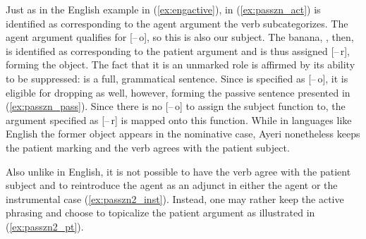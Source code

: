 Just as in the English example in (\ref{ex:engactive}),  in
(\ref{ex:passzn_act}) is identified as corresponding to the agent argument the
verb  subcategorizes. The agent argument qualifies for
[–\,o], so this is also our subject. The banana, , then, is
identified as corresponding to the patient argument and is thus assigned
[–\,r], forming the object. The fact that it is an unmarked role is affirmed by
its ability to be suppressed:  is a full, grammatical sentence. Since  is specified
as [–\,o], it is eligible for dropping as well, however, forming the passive
sentence presented in (\ref{ex:passzn_pass}). Since there is no [–\,o] to
assign the subject function to, the argument specified as [–\,r] is mapped onto
this function. While in languages like English the former object appears in the
nominative case, Ayeri nonetheless keeps the patient marking and the verb
agrees with the patient subject.

Also unlike in English, it is not possible to have the verb agree with the
patient subject and to reintroduce the agent as an adjunct in either the agent
or the instrumental case (\ref{ex:passzn2_inst}). Instead, one may rather keep
the active phrasing and choose to topicalize the patient argument as
illustrated in (\ref{ex:passzn2_pt}).

